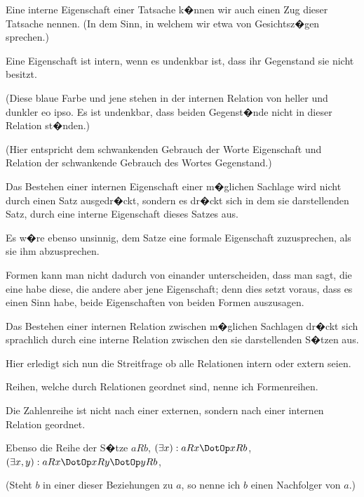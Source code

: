 {Eine interne Eigenschaft einer Tatsache k�nnen
wir auch einen Zug dieser Tatsache nennen. (In
dem Sinn, in welchem wir etwa von Gesichtsz�gen
sprechen.)}


{Eine Eigenschaft ist intern, wenn es undenkbar
ist, dass ihr Gegenstand sie nicht besitzt.

(Diese blaue Farbe und jene stehen in der
internen Relation von heller und dunkler eo ipso.
Es ist undenkbar, dass  beiden Gegenst�nde
nicht in dieser Relation st�nden.)

(Hier entspricht dem schwankenden Gebrauch
der Worte \glqq{}Eigenschaft\grqq{} und \glqq{}Relation\grqq{} der
schwankende Gebrauch des Wortes \glqq{}Gegenstand\grqq{}.)}


{Das Bestehen einer internen Eigenschaft einer
m�glichen Sachlage wird nicht durch einen Satz
ausgedr�ckt, sondern es dr�ckt sich in dem sie
darstellenden Satz, durch eine interne Eigenschaft
dieses Satzes aus.

Es w�re ebenso unsinnig, dem Satze eine
formale Eigenschaft zuzusprechen, als sie ihm
abzusprechen.}


{Formen kann man nicht dadurch von einander
unterscheiden, dass man sagt, die eine habe diese,
die andere aber jene Eigenschaft; denn dies setzt
voraus, dass es einen Sinn habe, beide Eigenschaften
von beiden Formen auszusagen.}


{Das Bestehen einer internen Relation zwischen
m�glichen Sachlagen dr�ckt sich sprachlich durch
eine interne Relation zwischen den sie darstellenden
S�tzen aus.}


{Hier erledigt sich nun die Streitfrage \glqq{}ob alle
Relationen intern oder extern\grqq{} seien.}


{Reihen, welche durch  Relationen
geordnet sind, nenne ich Formenreihen.

Die Zahlenreihe ist nicht nach einer externen,
sondern nach einer internen Relation geordnet.

{\stretchyspace
Ebenso die Reihe der S�tze \glqq{}$aRb$\grqq{},
\glqq{}$(\exists x): aRx \DotOp xRb$\grqq{},
\glqq{}$(\exists x,y): aRx \DotOp xRy \DotOp yRb$\grqq{}, \undSoFort}

(Steht $b$ in einer dieser Beziehungen zu $a$, so
nenne ich $b$ einen Nachfolger von $a$.)}


